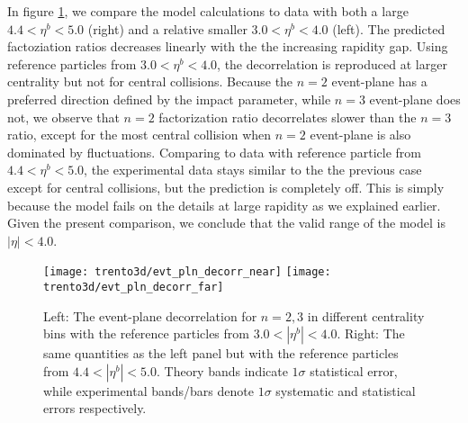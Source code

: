 In figure \ref{fig:trento:epd}, we compare the model calculations to data with both a large $4.4<\eta^b<5.0$ (right) and a relative smaller $3.0 < \eta^b< 4.0$ (left).
The predicted factoziation ratios decreases linearly with the the increasing rapidity gap.
Using reference particles from $3.0 < \eta^b< 4.0$, the decorrelation is reproduced at larger centrality but not for central collisions.
Because the $n=2$ event-plane has a preferred direction defined by the impact parameter, while $n=3$ event-plane does not, we observe that $n=2$ factorization ratio decorrelates slower than the $n=3$ ratio, except for the most central collision when $n=2$ event-plane is also dominated by fluctuations.
Comparing to data with reference particle from $4.4<\eta^b<5.0$, the experimental data stays similar to the the previous case except for central collisions, but the prediction is completely off.
This is simply because the model fails on the details at large rapidity as we explained earlier.
Given the present comparison, we conclude that the valid range of the model is $|\eta| < 4.0$.

\begin{figure}
\centering
\texttt{[image: trento3d/evt\_pln\_decorr\_near]}
\hfill
\texttt{[image: trento3d/evt\_pln\_decorr\_far]}
\caption{Left: The event-plane decorrelation for $n=2,3$ in different centrality bins with the reference particles from $3.0<|\eta^b|<4.0$.
  Right: The same quantities as the left panel but with the reference particles from $4.4<|\eta^b|<5.0$. 
  Theory bands indicate $1\sigma$ statistical error, while experimental bands/bars denote $1\sigma$ systematic and statistical errors respectively.}
\label{fig:trento:epd}
\end{figure}

